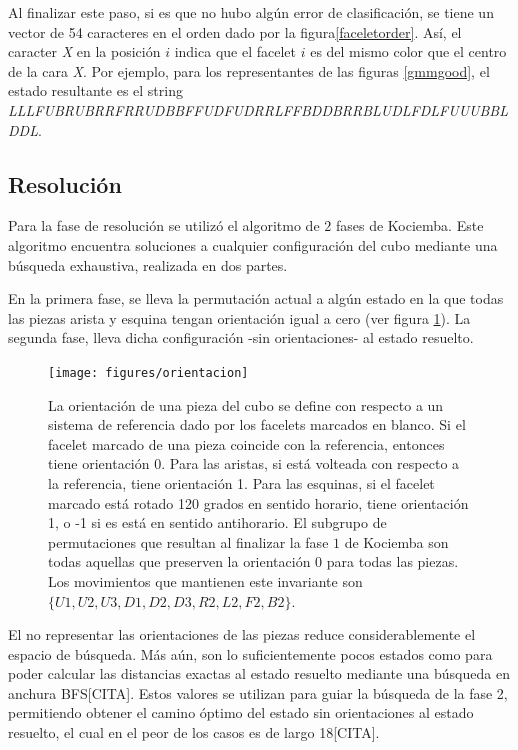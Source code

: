 Al finalizar este paso, si es que no hubo algún error de clasificación, se tiene un vector de 54 caracteres en el orden dado por la figura\ref{faceletorder}. Así, el caracter \textit{X} en la posición $i$ indica que el facelet $i$ es del mismo color que el centro de la cara \textit{X}. Por ejemplo, para los representantes de las figuras \ref{gmmgood}, el estado resultante es el string \textit{LLLFUBRUBRRFRRUDBBFFUDFUDRRLFFBDDBRRBLUDLFDLFUUUBBLDDL}.


\subsection{Resolución}
Para la fase de resolución se utilizó el algoritmo de $2$ fases de Kociemba.
Este algoritmo encuentra soluciones a cualquier configuración del cubo mediante una búsqueda exhaustiva, realizada en dos partes.

En la primera fase, se lleva la permutación actual a algún estado en la que todas las piezas arista y esquina tengan orientación igual a cero (ver figura \ref{orientation}). La segunda fase, lleva dicha configuración -sin orientaciones- al estado resuelto.

\begin{figure}[h!]
	\centering
	\texttt{[image: figures/orientacion]}
	\caption[Definición de orientación.]{La orientación de una pieza del cubo se define con respecto a un sistema de referencia dado por los facelets marcados en blanco. Si el facelet marcado de una pieza coincide con la referencia, entonces tiene orientación $0$. Para las aristas, si está volteada con respecto a la referencia, tiene orientación 1. Para las esquinas, si el facelet marcado está rotado 120 grados en sentido horario, tiene orientación 1, o -1 si es está en sentido antihorario. El subgrupo de permutaciones que resultan al finalizar la fase $1$ de Kociemba son todas aquellas que preserven la orientación 0 para todas las piezas. Los movimientos que mantienen este invariante son $\{U1, U2, U3, D1, D2, D3, R2, L2, F2, B2\}$.}
	\label{orientation}
\end{figure}
El no representar las orientaciones de las piezas reduce considerablemente el espacio de búsqueda. Más aún, son lo suficientemente pocos estados como para poder calcular las distancias exactas al estado resuelto mediante una búsqueda en anchura BFS[CITA]. Estos valores se utilizan para guiar la búsqueda de la fase 2, permitiendo obtener el camino óptimo del estado sin orientaciones al estado resuelto, el cual en el peor de los casos es de largo 18[CITA].

